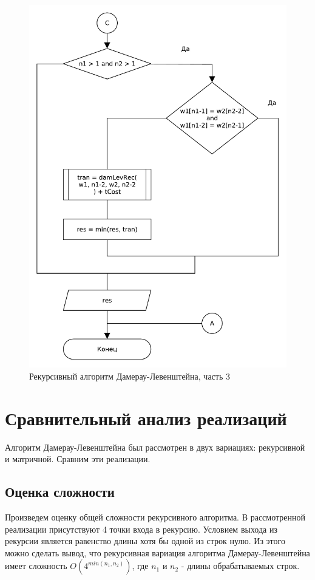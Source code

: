 \begin{figure}[H]
    \centering
    \includegraphics[scale=0.75]{pdf/damerau-levenshteainrec-part3.pdf}
    \caption{Рекурсивный алгоритм Дамерау-Левенштейна, часть 3}
\end{figure}

\section{Сравнительный анализ реализаций}
Алгоритм Дамерау-Левенштейна был рассмотрен в двух вариациях: рекурсивной и матричной. Сравним эти реализации.

\subsection{Оценка сложности}
Произведем оценку общей сложности рекурсивного алгоритма. В рассмотренной реализации присутствуют 4 точки входа в рекурсию. Условием выхода из рекурсии является равенство длины хотя бы одной из строк нулю. Из этого можно сделать вывод, что рекурсивная вариация алгоритма Дамерау-Левенштейна имеет сложность \(O(4^{min(n_1, n_2)})\), где \(n_1\) и \(n_2\) - длины обрабатываемых строк.

